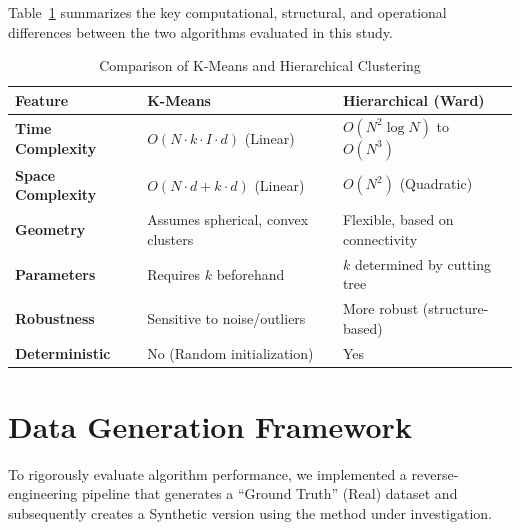 Table~\ref{tab:kmeans_vs_hc} summarizes the key computational, structural, and operational differences between the two algorithms evaluated in this study.

\begin{table}[H]
  \centering
  \caption[Comparison of K-Means and Hierarchical Clustering]{Comparison of K-Means and Hierarchical Clustering}
  \label{tab:kmeans_vs_hc}
  \renewcommand{\arraystretch}{1.2}
  \begin{tabular}{@{}lp{5.5cm}p{5.5cm}@{}}
    \toprule
    \textbf{Feature} & \textbf{K-Means} & \textbf{Hierarchical (Ward)} \\ \midrule
    \textbf{Time Complexity} & $O(N \cdot k \cdot I \cdot d)$ (Linear) & $O(N^2 \log N)$ to $O(N^3)$ \\
    \textbf{Space Complexity} & $O(N \cdot d + k \cdot d)$ (Linear) & $O(N^2)$ (Quadratic) \\
    \textbf{Geometry} & Assumes spherical, convex clusters & Flexible, based on connectivity \\
    \textbf{Parameters} & Requires $k$ beforehand & $k$ determined by cutting tree \\
    \textbf{Robustness} & Sensitive to noise/outliers & More robust (structure-based) \\
    \textbf{Deterministic} & No (Random initialization) & Yes \\ \bottomrule
  \end{tabular}
\end{table}

\section{Data Generation Framework}
\label{sec:data-generation-framework}

To rigorously evaluate algorithm performance, we implemented a reverse-engineering pipeline that generates a ``Ground Truth'' (Real) dataset and subsequently creates a Synthetic version using the method under investigation.

